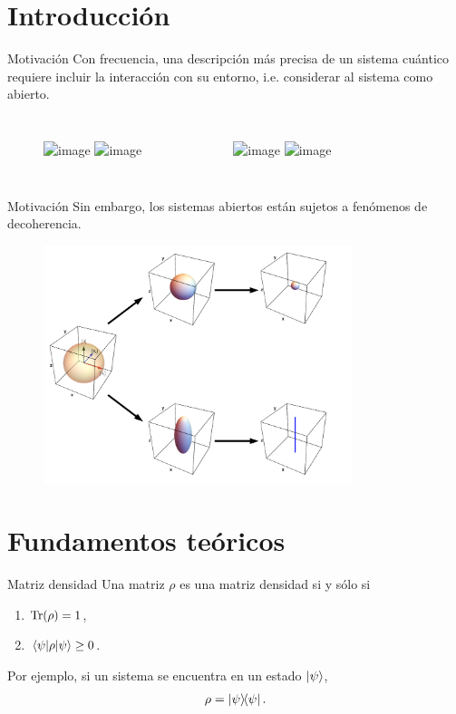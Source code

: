 \documentclass[xcolor=dvipsnames,presentation]{beamer}%
\begin{document}
\section{Introducción}
\label{sec:Intro}
\begin{frame}[t]{Motivación}
	Con frecuencia, una descripción más precisa de un sistema
	cuántico requiere incluir la interacción con su entorno, i.e. 
	considerar al sistema como abierto.
	\begin{columns}
		\begin{figure}
		\includegraphics<1>[width=\textwidth]{H_alone}
		\includegraphics<2>[width=\textwidth]{H_w_photons}
		\end{figure}
		\begin{figure}
		\includegraphics<1>[width=\textwidth]{lattice}
		\includegraphics<2>[width=\textwidth]{lattice_sub}
		\end{figure}
	\end{columns}
	
	
\end{frame}

\begin{frame}[t]{Motivación}
	Sin embargo, los sistemas abiertos están sujetos a fenómenos de decoherencia.
	\begin{figure}
	\centering
	\includegraphics[width=9cm]{decoherencia_motivacion}	
	\end{figure}
\end{frame}


\section{Fundamentos teóricos}
\begin{frame}{Matriz  densidad}
Una matriz $\rho$ es una matriz densidad si y sólo si
	\begin{enumerate}
		\item $\Tr (\rho)=1$,
		\item $\matrixel{\psi}{\rho}{\psi}\geq 0$.
	\end{enumerate}	\vfill

	Por ejemplo, si un sistema se encuentra en un estado $\ket{\psi}$,
  \begin{align*}
  \rho=\dyad{\psi}{\psi}.
  \end{align*}
\end{frame}
\end{document}
